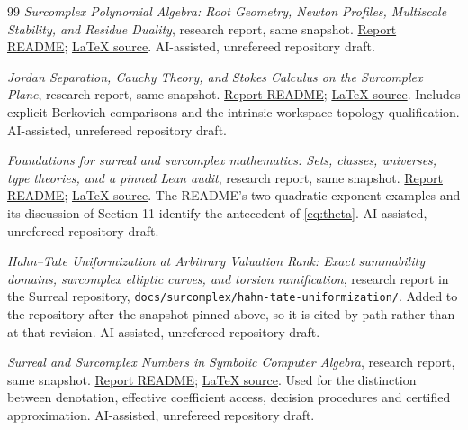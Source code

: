 \documentclass[11pt,a4paper]{article}
\numberwithin{equation}{section}
\theoremstyle{definition}
\theoremstyle{remark}
\newcommand{\repobase}{https://github.com/VladimirReshetnikov/Surreal/blob/e260237db9b71da8b74a0c13c8e6355119091100/}
\begin{document}
\begin{thebibliography}{99}
\emph{Surcomplex Polynomial Algebra: Root Geometry, Newton Profiles,
Multiscale Stability, and Residue Duality}, research report, same snapshot.
\href{\repobase docs/surcomplex/polynomial-algebra/README.md}{Report README};
\href{\repobase docs/surcomplex/polynomial-algebra/article.tex}{LaTeX source}.
AI-assisted, unrefereed repository draft.

\emph{Jordan Separation, Cauchy Theory, and Stokes Calculus on the Surcomplex
Plane}, research report, same snapshot.
\href{\repobase docs/surcomplex/contours-and-stokes/README.md}{Report README};
\href{\repobase docs/surcomplex/contours-and-stokes/article.tex}{LaTeX source}.
Includes explicit Berkovich comparisons and the intrinsic-workspace topology
qualification. AI-assisted, unrefereed repository draft.

\emph{Foundations for surreal and surcomplex mathematics: Sets, classes,
universes, type theories, and a pinned Lean audit}, research report,
same snapshot.
\href{\repobase docs/foundations-and-computation/foundations/README.md}{Report README};
\href{\repobase docs/foundations-and-computation/foundations/article.tex}{LaTeX source}.
The README's two quadratic-exponent examples and its discussion of
Section 11 identify the antecedent of \eqref{eq:theta}.
AI-assisted, unrefereed repository draft.

\emph{Hahn--Tate Uniformization at Arbitrary Valuation Rank: Exact
summability domains, surcomplex elliptic curves, and torsion ramification},
research report in the Surreal repository,
\texttt{docs/surcomplex/hahn-tate-uniformization/}.
Added to the repository after the snapshot pinned above, so it is cited by
path rather than at that revision.
AI-assisted, unrefereed repository draft.

\emph{Surreal and Surcomplex Numbers in Symbolic Computer Algebra}, research
report, same snapshot.
\href{\repobase docs/foundations-and-computation/computer-algebra/README.md}{Report README};
\href{\repobase docs/foundations-and-computation/computer-algebra/article.tex}{LaTeX source}.
Used for the distinction between denotation, effective coefficient access,
decision procedures and certified approximation.
AI-assisted, unrefereed repository draft.

\end{thebibliography}
\end{document}
